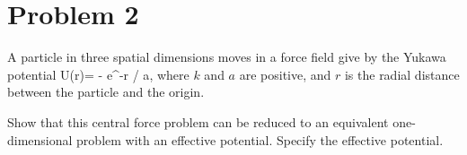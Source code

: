\newcommand{\Ur}{U(r)}
\newcommand{\vrh}{\vec{\hat{r}}}
\newcommand{\Ueff}{U_\text{eff}}

\newcommand{\vF}{\vec{F}}
\newcommand{\vJ}{\vec{J}}
\newcommand{\vtau}{\boldsymbol{\tau}}
\newcommand{\vr}{\vec{r}}

\newcommand{\rd}{\dot{r}}
\newcommand{\rdd}{\ddot{r}}
\newcommand{\phid}{\dot{\phi}}
\newcommand{\thd}{\dot{\theta}}

\newcommand{\rs}{r^*}
\newcommand{\Js}{{J^*}^2}

\newcommand{\ro}{r_0}
\newcommand{\rss}{\rs_s}
\newcommand{\rsu}{\rs_u}

\section{Problem 2}
\begin{statement}
	A particle in three spatial dimensions moves in a force field give by the Yukawa potential
	\beq
		\Ur = - e^{-r / a},
	\eeq
	where $k$ and $a$ are positive, and $r$ is the radial distance between the particle and the origin.
\end{statement}

\begin{problem}
	Show that this central force problem can be reduced to an equivalent one-dimensional problem with an effective potential.  Specify the effective potential.
\end{problem}

